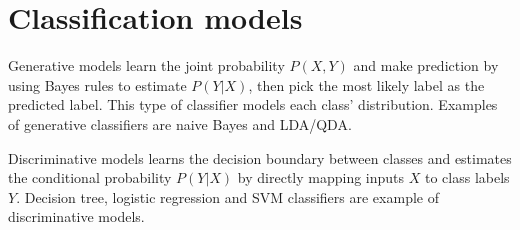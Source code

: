 \documentclass{article}
\begin{document}
\section{Classification models}
Generative models learn the joint probability $P(X,Y)$ and make prediction by using Bayes rules to estimate $P(Y|X)$, then pick the most likely label as the predicted label. This type of classifier models each class' distribution. Examples of generative classifiers are naive Bayes and LDA/QDA.

Discriminative models learns the decision boundary between classes and estimates the conditional probability $P(Y|X)$ by directly mapping inputs $X$ to class labels $Y$. Decision tree, logistic regression and SVM classifiers are example of discriminative models.
\end{document}
